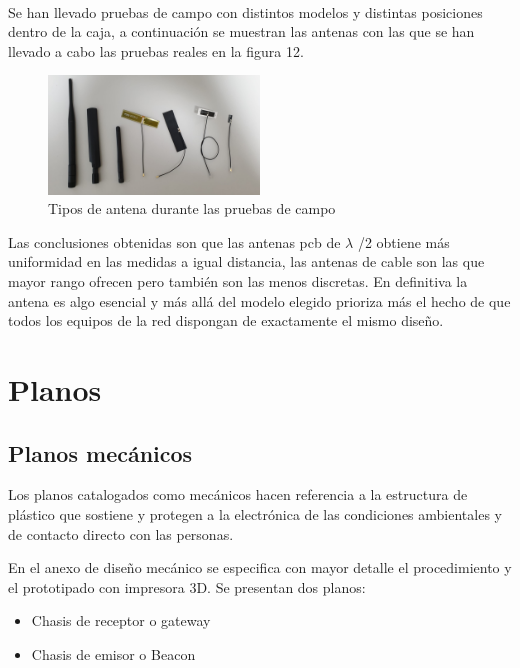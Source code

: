 \documentclass[paper=a4, fontsize=11pt,twoside]{scrartcl}	%
\begin{document}
            \paragraph{}
            Se han llevado pruebas de campo con distintos modelos y distintas posiciones dentro de la caja, a continuación se muestran las 
            antenas con las que se han llevado a cabo las pruebas reales en la figura 12.
            \begin{center}
                \begin{figure}[ht]
                    \centering
                    \includegraphics[width=0.5\textwidth]{antennas_variety.jpeg}
                    \caption{Tipos de antena durante las pruebas de campo}
                    \label{fig:mesh11}
                \end{figure}
            \end{center}
            Las conclusiones obtenidas son que las antenas pcb de $\lambda$ /2 obtiene más uniformidad en las medidas a igual distancia, las 
            antenas de cable son las que mayor rango ofrecen pero también son las menos discretas. En definitiva la antena es algo esencial y más 
            allá del modelo elegido prioriza más el hecho de que todos los equipos de la red dispongan de exactamente el mismo diseño.
\section{Planos}
    \subsection{Planos mecánicos}
        Los planos catalogados como mecánicos hacen referencia a la estructura de plástico
        que sostiene y protegen a la electrónica de las condiciones ambientales y de contacto directo con las 
        personas.

        En el anexo de diseño mecánico se especifica con mayor detalle el procedimiento y el prototipado con impresora
        3D. Se presentan dos planos:
        \begin{itemize}
            \item Chasis de receptor o gateway
            \item Chasis de emisor o Beacon
        \end{itemize}
\end{document}
